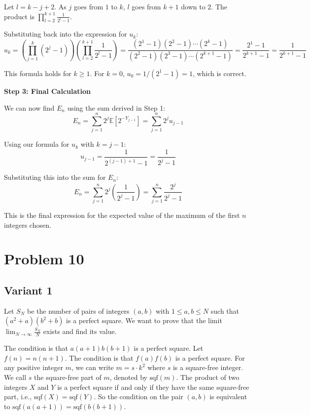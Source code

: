 \documentclass[12pt,a4paper]{article}
\theoremstyle{definition}
\begin{document}
        Let $l=k-j+2$. As $j$ goes from $1$ to $k$, $l$ goes from $k+1$ down to $2$. The product is $\prod_{l=2}^{k+1} \frac{1}{2^l-1}$.

        Substituting back into the expression for $u_k$:
        \[ u_k = \left(\prod_{j=1}^k (2^j-1)\right) \left(\prod_{l=2}^{k+1} \frac{1}{2^l-1}\right) = \frac{(2^1-1)(2^2-1)\cdots(2^k-1)}{(2^2-1)(2^3-1)\cdots(2^{k+1}-1)} = \frac{2^1-1}{2^{k+1}-1} = \frac{1}{2^{k+1}-1} \]

        This formula holds for $k \geq 1$. For $k=0$, $u_0 = 1/(2^1-1) = 1$, which is correct.

        \textbf{Step 3: Final Calculation}

        We can now find $E_n$ using the sum derived in Step 1:
        \[ E_n = \sum_{j=1}^n 2^j \mathbb{E}[2^{-Y_{j-1}}] = \sum_{j=1}^n 2^j u_{j-1} \]

        Using our formula for $u_k$ with $k=j-1$:
        \[ u_{j-1} = \frac{1}{2^{(j-1)+1}-1} = \frac{1}{2^j-1} \]

        Substituting this into the sum for $E_n$:
        \[ E_n = \sum_{j=1}^n 2^j \left(\frac{1}{2^j-1}\right) = \sum_{j=1}^n \frac{2^j}{2^j-1} \]

        This is the final expression for the expected value of the maximum of the first $n$ integers chosen.

    \section{Problem 10}

    \subsection{Variant 1}
    Let $S_N$ be the number of pairs of integers $(a,b)$ with $1 \leq a,b \leq N$ such that $(a^2 + a)(b^2 + b)$ is a perfect square. We want to prove that the limit $\lim_{N\to\infty}\frac{S_N}{N}$ exists and find its value.

    The condition is that $a(a+1)b(b+1)$ is a perfect square.
    Let $f(n) = n(n+1)$. The condition is that $f(a)f(b)$ is a perfect square.
    For any positive integer $m$, we can write $m = s \cdot k^2$ where $s$ is a square-free integer. We call $s$ the square-free part of $m$, denoted by $\text{sqf}(m)$.
    The product of two integers $X$ and $Y$ is a perfect square if and only if they have the same square-free part, i.e., $\text{sqf}(X) = \text{sqf}(Y)$.
    So the condition on the pair $(a,b)$ is equivalent to $\text{sqf}(a(a+1)) = \text{sqf}(b(b+1))$.
\end{document}
